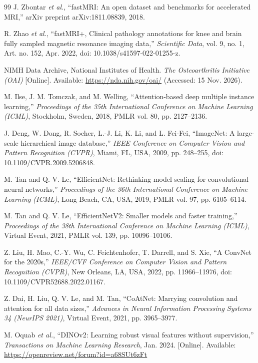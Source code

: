 \begin{thebibliography}{99}
 J. Zbontar \textit{et al.}, ``fastMRI: An open dataset and benchmarks for accelerated MRI,'' arXiv preprint arXiv:1811.08839, 2018.

 R. Zhao \textit{et al.}, ``fastMRI+, Clinical pathology annotations for knee and brain fully sampled magnetic resonance imaging data,'' \textit{Scientific Data}, vol. 9, no. 1, Art. no. 152, Apr. 2022, doi: 10.1038/s41597-022-01255-z.

 NIMH Data Archive, National Institutes of Health. \textit{The Osteoarthritis Initiative (OAI)} [Online]. Available: \url{https://nda.nih.gov/oai/} (Accessed: 15 Nov. 2026).

 M. Ilse, J. M. Tomczak, and M. Welling, ``Attention-based deep multiple instance learning,'' \textit{Proceedings of the 35th International Conference on Machine Learning (ICML)}, Stockholm, Sweden, 2018, PMLR vol. 80, pp. 2127--2136.

 J. Deng, W. Dong, R. Socher, L.-J. Li, K. Li, and L. Fei-Fei, ``ImageNet: A large-scale hierarchical image database,'' \textit{IEEE Conference on Computer Vision and Pattern Recognition (CVPR)}, Miami, FL, USA, 2009, pp. 248--255, doi: 10.1109/CVPR.2009.5206848.

 M. Tan and Q. V. Le, ``EfficientNet: Rethinking model scaling for convolutional neural networks,'' \textit{Proceedings of the 36th International Conference on Machine Learning (ICML)}, Long Beach, CA, USA, 2019, PMLR vol. 97, pp. 6105--6114.

 M. Tan and Q. V. Le, ``EfficientNetV2: Smaller models and faster training,'' \textit{Proceedings of the 38th International Conference on Machine Learning (ICML)}, Virtual Event, 2021, PMLR vol. 139, pp. 10096--10106.

 Z. Liu, H. Mao, C.-Y. Wu, C. Feichtenhofer, T. Darrell, and S. Xie, ``A ConvNet for the 2020s,'' \textit{IEEE/CVF Conference on Computer Vision and Pattern Recognition (CVPR)}, New Orleans, LA, USA, 2022, pp. 11966--11976, doi: 10.1109/CVPR52688.2022.01167.

 Z. Dai, H. Liu, Q. V. Le, and M. Tan, ``CoAtNet: Marrying convolution and attention for all data sizes,'' \textit{Advances in Neural Information Processing Systems 34 (NeurIPS 2021)}, Virtual Event, 2021, pp. 3965--3977.

 M. Oquab \textit{et al.}, ``DINOv2: Learning robust visual features without supervision,'' \textit{Transactions on Machine Learning Research}, Jan. 2024. [Online]. Available: \url{https://openreview.net/forum?id=a68SUt6zFt}


\end{thebibliography}
